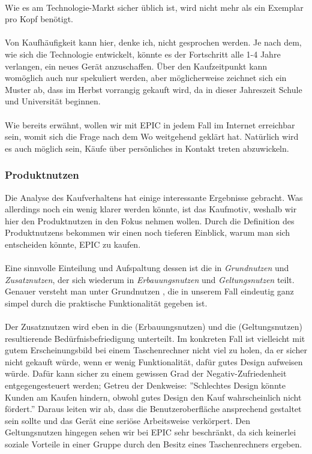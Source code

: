\\
Wie es am Technologie-Markt sicher üblich ist, wird nicht mehr als ein Exemplar pro Kopf benötigt.\\
\\
Von Kaufhäufigkeit kann hier, denke ich, nicht gesprochen werden. Je nach dem, wie sich die Technologie entwickelt, könnte es der Fortschritt alle 1-4 Jahre verlangen, ein neues Gerät anzuschaffen. Über den Kaufzeitpunkt kann womöglich auch nur spekuliert werden, aber möglicherweise zeichnet sich ein Muster ab, dass im Herbst vorrangig gekauft wird, da in dieser Jahreszeit Schule und Universität beginnen.\\
\\
Wie bereits erwähnt, wollen wir mit EPIC in jedem Fall im Internet erreichbar sein, womit sich die Frage nach dem Wo weitgehend geklärt hat. Natürlich wird es auch möglich sein, Käufe über persönliches in Kontakt treten abzuwickeln.\\

\subsubsection{Produktnutzen}
Die Analyse des Kaufverhaltens hat einige interessante Ergebnisse gebracht. Was allerdings noch ein wenig klarer werden könnte, ist das Kaufmotiv, weshalb wir hier den Produktnutzen in den Fokus nehmen wollen. Durch die Definition des Produktnutzens bekommen wir einen noch tieferen Einblick, warum man sich entscheiden könnte, EPIC zu kaufen.\\
\\
Eine sinnvolle Einteilung und Aufspaltung dessen ist die in \textit{Grundnutzen} und \textit{Zusatznutzen}, der sich wiederum in \textit{Erbauungsnutzen} und \textit{Geltungsnutzen} teilt. Genauer versteht man unter Grundnutzen , die in unserem Fall eindeutig ganz simpel durch die praktische Funktionalität gegeben ist.\\
\\
Der Zusatznutzen wird eben in die  (Erbauungsnutzen) und die  (Geltungsnutzen) resultierende Bedürfnisbefriedigung unterteilt. Im konkreten Fall ist vielleicht mit gutem Erscheinungsbild bei einem Taschenrechner nicht viel zu holen, da er sicher nicht gekauft würde, wenn er wenig Funktionalität, dafür gutes Design aufweisen würde. Dafür kann sicher zu einem gewissen Grad der Negativ-Zufriedenheit entgegengesteuert werden; Getreu der Denkweise: ''Schlechtes Design könnte Kunden am Kaufen hindern, obwohl gutes Design den Kauf wahrscheinlich nicht fördert.'' Daraus leiten wir ab, dass die Benutzeroberfläche ansprechend gestaltet sein sollte und das Gerät eine seriöse Arbeitsweise verkörpert. Den Geltungsnutzen hingegen sehen wir bei EPIC sehr beschränkt, da sich keinerlei soziale Vorteile in einer Gruppe durch den Besitz eines Taschenrechners ergeben.